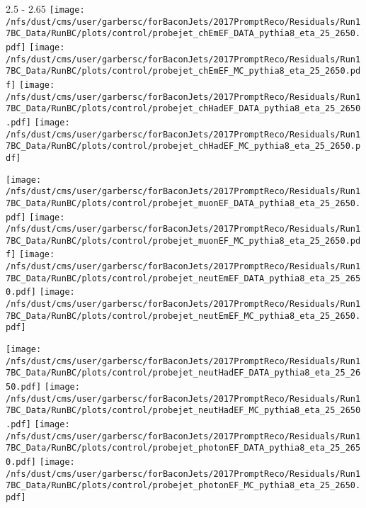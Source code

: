 \documentclass[t,compress]{beamer}
\begin{document}
\begin{frame}{2.5 - 2.65}
	\texttt{[image: /nfs/dust/cms/user/garbersc/forBaconJets/2017PromptReco/Residuals/Run17BC\_Data/RunBC/plots/control/probejet\_chEmEF\_DATA\_pythia8\_eta\_25\_2650.pdf]}
	\texttt{[image: /nfs/dust/cms/user/garbersc/forBaconJets/2017PromptReco/Residuals/Run17BC\_Data/RunBC/plots/control/probejet\_chEmEF\_MC\_pythia8\_eta\_25\_2650.pdf]}
	\texttt{[image: /nfs/dust/cms/user/garbersc/forBaconJets/2017PromptReco/Residuals/Run17BC\_Data/RunBC/plots/control/probejet\_chHadEF\_DATA\_pythia8\_eta\_25\_2650.pdf]}
	\texttt{[image: /nfs/dust/cms/user/garbersc/forBaconJets/2017PromptReco/Residuals/Run17BC\_Data/RunBC/plots/control/probejet\_chHadEF\_MC\_pythia8\_eta\_25\_2650.pdf]}
\newline

\vspace{-0.65cm}
	\texttt{[image: /nfs/dust/cms/user/garbersc/forBaconJets/2017PromptReco/Residuals/Run17BC\_Data/RunBC/plots/control/probejet\_muonEF\_DATA\_pythia8\_eta\_25\_2650.pdf]}
	\texttt{[image: /nfs/dust/cms/user/garbersc/forBaconJets/2017PromptReco/Residuals/Run17BC\_Data/RunBC/plots/control/probejet\_muonEF\_MC\_pythia8\_eta\_25\_2650.pdf]}
	\texttt{[image: /nfs/dust/cms/user/garbersc/forBaconJets/2017PromptReco/Residuals/Run17BC\_Data/RunBC/plots/control/probejet\_neutEmEF\_DATA\_pythia8\_eta\_25\_2650.pdf]}
	\texttt{[image: /nfs/dust/cms/user/garbersc/forBaconJets/2017PromptReco/Residuals/Run17BC\_Data/RunBC/plots/control/probejet\_neutEmEF\_MC\_pythia8\_eta\_25\_2650.pdf]}
\newline

\vspace{-0.65cm}
	\texttt{[image: /nfs/dust/cms/user/garbersc/forBaconJets/2017PromptReco/Residuals/Run17BC\_Data/RunBC/plots/control/probejet\_neutHadEF\_DATA\_pythia8\_eta\_25\_2650.pdf]}
	\texttt{[image: /nfs/dust/cms/user/garbersc/forBaconJets/2017PromptReco/Residuals/Run17BC\_Data/RunBC/plots/control/probejet\_neutHadEF\_MC\_pythia8\_eta\_25\_2650.pdf]}
	\texttt{[image: /nfs/dust/cms/user/garbersc/forBaconJets/2017PromptReco/Residuals/Run17BC\_Data/RunBC/plots/control/probejet\_photonEF\_DATA\_pythia8\_eta\_25\_2650.pdf]}
	\texttt{[image: /nfs/dust/cms/user/garbersc/forBaconJets/2017PromptReco/Residuals/Run17BC\_Data/RunBC/plots/control/probejet\_photonEF\_MC\_pythia8\_eta\_25\_2650.pdf]}
\end{frame}
\end{document}
